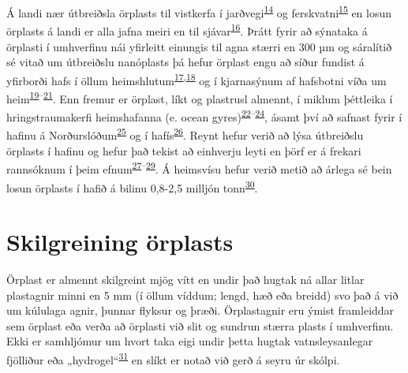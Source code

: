 \documentclass[icelandic,]{book}
\begin{document}
Á landi nær útbreiðsla örplasts til vistkerfa í jarðvegi\textsuperscript{\protect\hyperlink{ref-de2018impacts}{14}} og ferskvatni\textsuperscript{\protect\hyperlink{ref-besseling2017fate}{15}} en losun örplasts á landi er alla jafna meiri en til sjávar\textsuperscript{\protect\hyperlink{ref-horton2017microplastics}{16}}. Þrátt fyrir að sýnataka á örplasti í umhverfinu nái yfirleitt einungis til agna stærri en 300 µm og sáralítið sé vitað um útbreiðslu nanóplasts þá hefur örplast engu að síður fundist á yfirborði hafs í öllum heimshlutum\textsuperscript{\protect\hyperlink{ref-eriksen2014plastic}{17},\protect\hyperlink{ref-cozar2014plastic}{18}} og í kjarnasýnum af hafsbotni víða um heim\textsuperscript{\protect\hyperlink{ref-goldberg1997plasticizing}{19}--\protect\hyperlink{ref-woodall2014deep}{21}}. Enn fremur er örplast, líkt og plastrusl almennt, í miklum þéttleika í hringstraumakerfi heimshafanna (e. ocean gyres)\textsuperscript{\protect\hyperlink{ref-law2010plastic}{22}--\protect\hyperlink{ref-lebreton2018evidence}{24}}, ásamt því að safnast fyrir í hafinu á Norðurslóðum\textsuperscript{\protect\hyperlink{ref-cozar2017arctic}{25}} og í hafís\textsuperscript{\protect\hyperlink{ref-obbard2014global}{26}}. Reynt hefur verið að lýsa útbreiðslu örplasts í hafinu og hefur það tekist að einhverju leyti en þörf er á frekari rannsóknum í þeim efnum\textsuperscript{\protect\hyperlink{ref-enders2015abundance}{27}--\protect\hyperlink{ref-auta2017distribution}{29}}. Á heimsvísu hefur verið metið að árlega sé bein losun örplasts í hafið á bilinu 0,8-2,5 milljón tonn\textsuperscript{\protect\hyperlink{ref-boucher2017primary}{30}}.

\hypertarget{skilgreining-orplasts}{%
\section*{Skilgreining örplasts}\label{skilgreining-orplasts}}

Örplast er almennt skilgreint mjög vítt en undir það hugtak ná allar litlar plastagnir minni en 5 mm (í öllum víddum; lengd, hæð eða breidd) svo það á við um kúlulaga agnir, þunnar flyksur og þræði. Örplastagnir eru ýmist framleiddar sem örplast eða verða að örplasti við slit og sundrun stærra plasts í umhverfinu. Ekki er samhljómur um hvort taka eigi undir þetta hugtak vatnsleysanlegar fjölliður eða „hydrogel``\textsuperscript{\protect\hyperlink{ref-Bergmann2015}{31}} en slíkt er notað við gerð á seyru úr skólpi.
\end{document}
